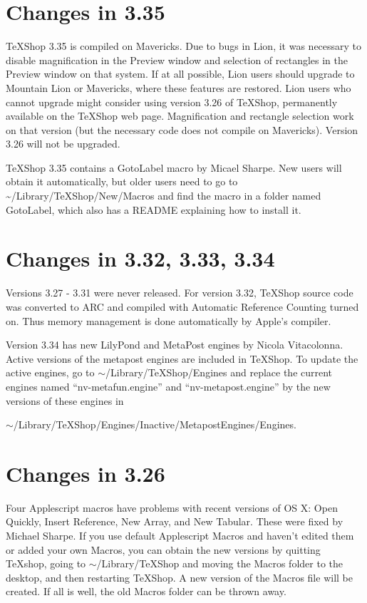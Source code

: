 \documentclass[11pt, oneside]{amsart}
\begin{document}
\section{Changes in 3.35}

TeXShop 3.35 is compiled on Mavericks. Due to bugs in Lion, it was necessary to disable magnification in the Preview window and selection of rectangles in the Preview window on that system. If at all possible, Lion users should upgrade to Mountain Lion or Mavericks, where these features are restored. Lion users who cannot
upgrade might consider using version 3.26 of TeXShop, permanently available on the TeXShop web page. Magnification and rectangle selection work on that version (but the necessary code does not compile on Mavericks). Version 3.26 will not be upgraded.

TeXShop 3.35 contains a GotoLabel macro by Micael Sharpe. New users will obtain it automatically, but older users need to go to \textasciitilde/Library/TeXShop/New/Macros
and find the macro in a folder named GotoLabel, which also has a  README explaining how to install it.



\section{Changes in 3.32, 3.33, 3.34}

Versions 3.27 - 3.31 were never released. For version 3.32, TeXShop source code was converted to ARC and compiled with Automatic Reference Counting
turned on. Thus memory management is done automatically by Apple's compiler.

Version 3.34 has new LilyPond and MetaPost engines by Nicola Vitacolonna.  Active versions of the metapost engines are included in TeXShop. To update
the active  engines, go to  $\sim$/Library/TeXShop/Engines and replace the current engines named ``nv-metafun.engine'' and ``nv-metapost.engine'' by the new
versions of these engines in 

\hspace{.5in} $\sim$/Library/TeXShop/Engines/Inactive/MetapostEngines/Engines.

\section{Changes in 3.26}

Four Applescript macros have problems with recent versions of OS X:  Open Quickly, Insert Reference, New Array, and New Tabular. These  were fixed by
Michael Sharpe. If you use 
default Applescript Macros and haven't edited them or added your own Macros, you can obtain
the new versions by quitting TeXshop, going to $\sim$/Library/TeXShop and moving the Macros
folder to the desktop, and then restarting TeXShop. A new version of the Macros file will be
created. If all is well, the old Macros folder can be thrown away.
\end{document}
